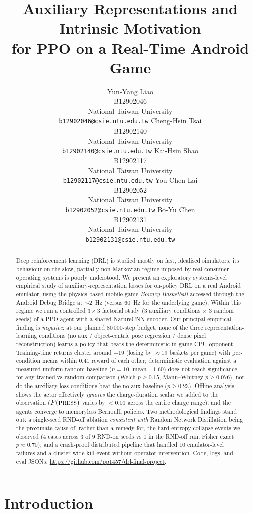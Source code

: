 \documentclass{article}
\title{Auxiliary Representations and Intrinsic Motivation\\
       for PPO on a Real-Time Android Game}
\author{%
  Yun-Yang Liao \\ B12902046 \\ National Taiwan University \\ \texttt{b12902046@csie.ntu.edu.tw}
  \And
  Cheng-Hsin Tsai \\ B12902140 \\ National Taiwan University \\ \texttt{b12902140@csie.ntu.edu.tw}
  \And
  Kai-Hsin Shao \\ B12902117 \\ National Taiwan University \\ \texttt{b12902117@csie.ntu.edu.tw}
  \And
  You-Chen Lai \\ B12902052 \\ National Taiwan University \\ \texttt{b12902052@csie.ntu.edu.tw}
  \And
  Bo-Yu Chen \\ B12902131 \\ National Taiwan University \\ \texttt{b12902131@csie.ntu.edu.tw}
}
\begin{document}
\maketitle

\begin{abstract}
Deep reinforcement learning (DRL) is studied mostly on fast,
idealised simulators; its behaviour on the slow, partially
non-Markovian regime imposed by real consumer operating systems
is poorly understood. We present an exploratory systems-level
empirical study of auxiliary-representation losses for on-policy
DRL on a real Android emulator, using the physics-based mobile
game \emph{Bouncy Basketball} accessed through the Android Debug
Bridge at $\sim$\SI{2}{\hertz} (versus \SI{60}{\hertz} for the
underlying game). Within this regime we run a controlled
$3\times3$ factorial study (3 auxiliary conditions $\times$ 3
random seeds) of a PPO agent with a shared NatureCNN encoder.
Our principal empirical finding is \emph{negative}: at our
planned $80\,000$-step budget, none of the three
representation-learning conditions (no aux / object-centric pose
regression / dense pixel reconstruction) learns a policy that
beats the deterministic in-game CPU opponent. Training-time
returns cluster around $-19$ (losing by $\approx 19$ baskets per
game) with per-condition means within $0.41$ reward of each
other; deterministic evaluation against a measured uniform-random
baseline ($n=10$, mean $-1.60$) does not reach significance for
any trained-vs-random comparison (Welch $p \geq 0.15$,
Mann--Whitney $p \geq 0.076$), nor do the auxiliary-loss
conditions beat the no-aux baseline ($p \geq 0.23$). Offline
analysis shows the actor effectively \emph{ignores} the
charge-duration scalar we added to the observation
($P(\textsc{press})$ varies by $<\!0.01$ across the entire charge
range), and the agents converge to memoryless Bernoulli policies.
Two methodological findings stand out: a single-seed RND-off
ablation \emph{consistent with} Random Network Distillation being
the proximate cause of, rather than a remedy for, the hard
entropy-collapse events we observed ($4$ cases across $3$ of $9$
RND-on seeds vs $0$ in the RND-off run, Fisher exact
$p \approx 0.70$); and a crash-proof distributed pipeline that
handled 10 emulator-level failures and a cluster-wide kill event
without operator intervention. Code, logs, and eval JSONs:
\url{https://github.com/pp1457/drl-final-project}.
\end{abstract}

\section{Introduction}
\label{sec:intro}
\end{document}
